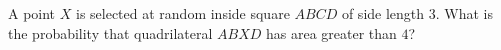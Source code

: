 A point $X$ is selected at random inside square $ABCD$ of side length $3$. What is the probability that quadrilateral $ABXD$ has area greater than $4$?
